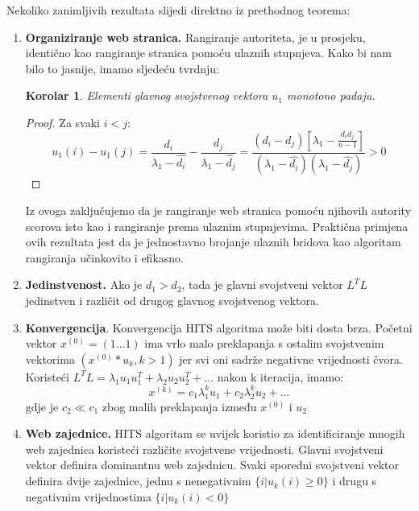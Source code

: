 \documentclass[11pt]{article}
\newtheorem{corollary}{Korolar}[theorem]
\begin{document}
Nekoliko zanimljivih rezultata slijedi direktno iz prethodnog teorema:
\begin{enumerate}
    \item \textbf{Organiziranje web stranica.} Rangiranje autoriteta, je u prosjeku, identično kao rangiranje stranica pomoću ulaznih stupnjeva. Kako bi nam bilo to jasnije, imamo sljedeću tvrdnju:
    \begin{corollary}
    Elementi glavnog svojstvenog vektora $u_{1}$ monotono padaju.
    \end{corollary}
    \begin{proof}
    Za svaki $i < j$:
    \begin{equation*}
        u_{1} (i) - u_{1}(j) = \frac{d_{i}}{\lambda_{1} - \hat{d_{i}}} - \frac{d_{j}}{\lambda_{1} - \hat{d_{j}}} = \frac{(d_{i} - d_{j})[\lambda_{1} - \frac{d_{i}d_{j}}{n-1}]}{(\lambda_{1} - \hat{d_{i}})(\lambda_{1} - \hat{d_{j}})} > 0
    \end{equation*}
    \end{proof}
     Iz ovoga zaključujemo da je rangiranje web stranica pomoću njihovih autority scorova isto kao i rangiranje prema ulaznim stupnjevima. Praktična primjena ovih rezultata jest da je jednostavno brojanje ulaznih bridova kao algoritam rangiranja učinkovito i efikasno.
     
     \item \textbf{Jedinstvenost.} Ako je $d_{1} > d_{2}$, tada je glavni svojstveni vektor $L^{T}L$ jedinstven i različit od drugog glavnog svojstvenog vektora.
     
     \item \textbf{Konvergencija}. Konvergencija HITS algoritma može biti dosta brza. Početni vektor $x^{(0)} = (1 \ldots 1) $ ima vrlo malo preklapanja s ostalim svojstvenim vektorima $(x^{(0)} * u_{k}, k > 1)$ jer svi oni sadrže negativne vrijednosti čvora.
     Koristeći $L^{T}L = \lambda_{1}u_{1}u_{1}^{T} + \lambda_{2}u_{2}u_{2}^{T} + \ldots $ nakon k iteracija, imamo:
     \begin{equation*}
         x^{(k)} = c_{1}\lambda_{1}^{k}u_{1} +  c_{2}\lambda_{2}^{k}u_{2} + \ldots 
     \end{equation*}
     gdje je $c_{2} \ll c_{1}$ zbog malih preklapanja između $x^{(0)}$ i $u_{2}$
     
     \item \textbf{Web zajednice.} HITS algoritam se uvijek koristio za identificiranje mnogih web zajednica koristeći različite svojstvene vrijednosti. Glavni svojstveni vektor definira dominantnu web zajednicu. Svaki sporedni svojstveni vektor definira dvije zajednice, jednu s nenegativnim $\{i | u_{k}(i) \geq 0\}$ i drugu s negativnim vrijednostima $\{i | u_{k}(i) < 0\}$
\end{enumerate}
\end{document}
